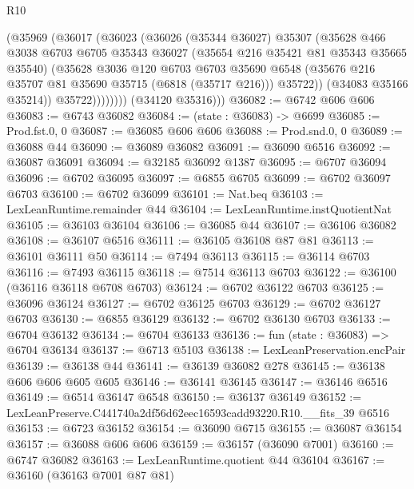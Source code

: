 \begin{lexlean}{R10}
\begin{coremodule}
                  (@35969
                    (@36017
                      (@36023
                        (@36026
                          (@35344 @36027)
                          @35307
                          (@35628
                            @466
                            @3038
                            @6703
                            @6705
                            @35343
                            @36027
                            (@35654 @216 @35421 @81 @35343 @35665 @35540)
                            (@35628
                              @3036
                              @120
                              @6703
                              @6703
                              @35690
                              @6548
                              (@35676 @216 @35707 @81 @35690 @35715 (@6818 (@35717 @216)))
                              @35722))
                          (@34083 @35166 @35214))
                        @35722))))))))
        (@34120 @35316)))
@36082 := @6742 @606 @606
@36083 := @6743 @36082
@36084 := (state : @36083) -> @6699
@36085 := Prod.fst.{0, 0}
@36087 := @36085 @606 @606
@36088 := Prod.snd.{0, 0}
@36089 := @36088 @44
@36090 := @36089 @36082
@36091 := @36090 @6516
@36092 := @36087 @36091
@36094 := @32185 @36092 @1387
@36095 := @6707 @36094
@36096 := @6702 @36095
@36097 := @6855 @6705
@36099 := @6702 @36097 @6703
@36100 := @6702 @36099
@36101 := Nat.beq
@36103 := LexLeanRuntime.remainder @44
@36104 := LexLeanRuntime.instQuotientNat
@36105 := @36103 @36104
@36106 := @36085 @44
@36107 := @36106 @36082
@36108 := @36107 @6516
@36111 := @36105 @36108 @87 @81
@36113 := @36101 @36111 @50
@36114 := @7494 @36113
@36115 := @36114 @6703
@36116 := @7493 @36115
@36118 := @7514 @36113 @6703
@36122 := @36100 (@36116 @36118 @6708 @6703)
@36124 := @6702 @36122 @6703
@36125 := @36096 @36124
@36127 := @6702 @36125 @6703
@36129 := @6702 @36127 @6703
@36130 := @6855 @36129
@36132 := @6702 @36130 @6703
@36133 := @6704 @36132
@36134 := @6704 @36133
@36136 := fun (state : @36083) => @6704 @36134
@36137 := @6713 @5103
@36138 := LexLeanPreservation.encPair
@36139 := @36138 @44
@36141 := @36139 @36082 @278
@36145 := @36138 @606 @606 @605 @605
@36146 := @36141 @36145
@36147 := @36146 @6516
@36149 := @6514 @36147 @6548
@36150 := @36137 @36149
@36152 := LexLeanPreserve.C441740a2df56d62eec16593cadd93220.R10.__fits_39 @6516
@36153 := @6723 @36152
@36154 := @36090 @6715
@36155 := @36087 @36154
@36157 := @36088 @606 @606
@36159 := @36157 (@36090 @7001)
@36160 := @6747 @36082
@36163 := LexLeanRuntime.quotient @44 @36104
@36167 := @36160 (@36163 @7001 @87 @81)

\end{coremodule}
\end{lexlean}
